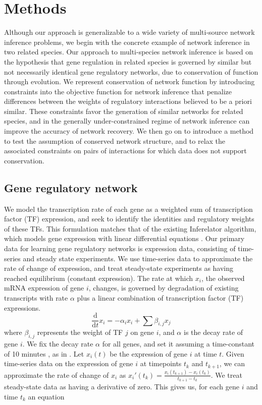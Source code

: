\documentclass[11pt]{article}
\begin{document}
\section{Methods}
Although our approach is generalizable to a wide variety of multi-source network inference problems, we begin with the concrete example of network inference in two related species. Our approach to multi-species network inference is based on the hypothesis that gene regulation in related species is governed by similar but not necessarily identical gene regulatory networks, due to conservation of function through evolution. We represent conservation of network function by introducing constraints into the objective function for network inference that penalize differences between the weights of regulatory interactions believed to be a priori similar. These constraints favor the generation of similar networks for related species, and in the generally under-constrained regime of network inference can improve the accuracy of network recovery. We then go on to introduce a method to test the assumption of conserved network structure, and to relax the associated constraints on pairs of interactions for which data does not support conservation.

\subsection{Gene regulatory network}
We model the transcription rate of each gene as a weighted sum of transcription factor (TF) expression, and seek to identify the identities and regulatory weights of these TFs. This formulation matches that of the existing Inferelator algorithm, which models gene expression with linear differential equations \cite{bonneau_inferelator:_2006-1}. Our primary data for learning gene regulatory networks is expression data, consisting of time-series and steady state experiments. We use time-series data to approximate the rate of change of expression, and treat steady-state experiments as having reached equilibrium (constant expression). The rate at which $x_{i}$, the observed mRNA expression of gene $i$, changes, is governed by degradation of existing transcripts with rate $\alpha$ plus a linear combination of transcription factor (TF) expressions. 
\begin{equation}
\frac{\mathrm d}{\mathrm d t} x_i = -\alpha_{i}x_{i} + \sum \beta_{i,j}x_{j}
\end{equation}
where $\beta_{i,j}$ represents the weight of TF $j$ on gene $i$, and $\alpha$ is the decay rate of gene $i$. We fix the decay rate $\alpha$ for all genes, and set it assuming a time-constant of 10 minutes \cite{hambraeus_genome-wide_2003, selinger_global_2003}, as in \cite{greenfield_robust_2013}. Let $x_i(t)$ be the expression of gene $i$ at time $t$. Given time-series data on the expression of gene $i$ at timepoints $t_k$ and $t_{k+1}$, we can approximate the rate of change of $x_i$ as $x_i'(t_k)=\frac{x_i(t_{k+1})-x_i(t_k)}{t_{k+1}-t_k}$. We treat steady-state data as having a derivative of zero. This gives us, for each gene $i$ and time $t_{k}$ an equation
\end{document}
